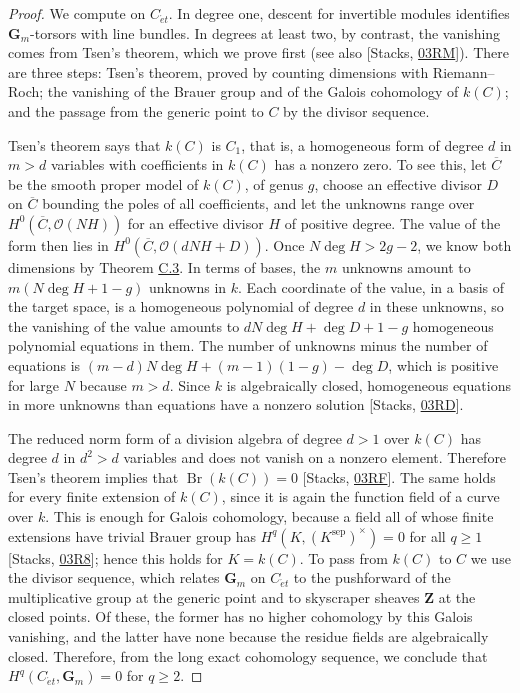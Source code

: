 \documentclass[11pt]{article}
\begin{document}
\begin{proof}[{Proof}]\label{bp179}%
We compute on \(C_{\acute{e}t}\). In degree one, descent for invertible modules identifies \(\mathbf G_m\)-torsors with line bundles. In degrees at least two, by contrast, the vanishing comes from Tsen's theorem, which we prove first (see also [Stacks, \href{https://stacks.math.columbia.edu/tag/03RM}{03RM}]). There are three steps: Tsen's theorem, proved by counting dimensions with Riemann–Roch; the vanishing of the Brauer group and of the Galois cohomology of \(k(C)\); and the passage from the generic point to \(C\) by the divisor sequence.

Tsen's theorem says that \(k(C)\) is \(C_1\), that is, a homogeneous form of degree \(d\) in \(m>d\) variables with coefficients in \(k(C)\) has a nonzero zero.  To see this, let \(\overline C\) be the smooth proper model of \(k(C)\), of genus \(g\), choose an effective divisor \(D\) on \(\overline C\) bounding the poles of all coefficients, and let the unknowns range over \(H^0(\overline C,\mathcal O(NH))\) for an effective divisor \(H\) of positive degree.  The value of the form then lies in \(H^0(\overline C,\mathcal O(dNH+D))\).  Once \(N\deg H>2g-2\), we know both dimensions by Theorem \hyperref[bp130]{C.3}.  In terms of bases, the \(m\) unknowns amount to \(m(N\deg H+1-g)\) unknowns in \(k\). Each coordinate of the value, in a basis of the target space, is a homogeneous polynomial of degree \(d\) in these unknowns, so the vanishing of the value amounts to \(dN\deg H+\deg D+1-g\) homogeneous polynomial equations in them.  The number of unknowns minus the number of equations is \((m-d)N\deg H+(m-1)(1-g)-\deg D\), which is positive for large \(N\) because \(m>d\).  Since \(k\) is algebraically closed, homogeneous equations in more unknowns than equations have a nonzero solution [Stacks, \href{https://stacks.math.columbia.edu/tag/03RD}{03RD}].

The reduced norm form of a division algebra of degree \(d>1\) over \(k(C)\) has degree \(d\) in \(d^2>d\) variables and does not vanish on a nonzero element.  Therefore Tsen's theorem implies that \(\operatorname{Br}(k(C))=0\) [Stacks, \href{https://stacks.math.columbia.edu/tag/03RF}{03RF}].  The same holds for every finite extension of \(k(C)\), since it is again the function field of a curve over \(k\). This is enough for Galois cohomology, because a field all of whose finite extensions have trivial Brauer group has \(H^q(K,(K^{\mathrm{sep}})^\times)=0\) for all \(q\geq1\) [Stacks, \href{https://stacks.math.columbia.edu/tag/03R8}{03R8}]; hence this holds for \(K=k(C)\). To pass from \(k(C)\) to \(C\) we use the divisor sequence, which relates \(\mathbf G_m\) on \(C_{\acute{e}t}\) to the pushforward of the multiplicative group at the generic point and to skyscraper sheaves \(\mathbf Z\) at the closed points. Of these, the former has no higher cohomology by this Galois vanishing, and the latter have none because the residue fields are algebraically closed. Therefore, from the long exact cohomology sequence, we conclude that \(H^q(C_{\acute{e}t},\mathbf G_m)=0\) for \(q\geq2\).


\end{proof}
\end{document}
